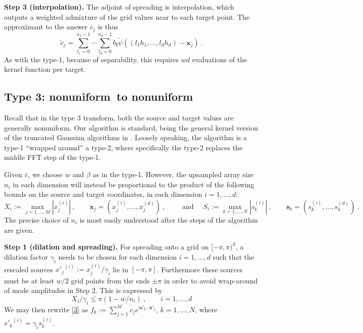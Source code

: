 \documentclass[10pt]{article}
\newcommand{\be}{\begin{equation}}
\newcommand{\ee}{\end{equation}}
\newcommand{\mbf}[1]{{\mathbf #1}}
\newcommand{\eps}{\varepsilon}
\newcommand{\xx}{\mbf{x}}
\newcommand{\sss}{\mbf{s}}
\newcommand{\freq}{\beta}          %
\newcommand{\ppsi}{{\tilde\psi}}   %
\newcommand{\NU}{{nonuniform}}       %
\begin{document}
{\bf Step 3 (interpolation).}
The adjoint of spreading is interpolation, which
outputs a weighted admixture of the
grid values near to each target point.
The approximant to the answer $c_j$ is thus
\be
\tilde c_j = \sum_{l_1=0}^{n_1-1} \cdots \sum_{l_d=0}^{n_d-1}
b_\mbf{l} \ppsi((l_1h_1,\dots,l_dh_d) - \xx_j)
~.
\label{interp}
\ee
As with the type-1,
because of separability,
this requires $wd$ evaluations of the kernel function per target.



\subsection{Type 3: \NU\ to \NU}

Recall that in the type 3 transform,
both the source and target values are generally \NU.
Our algorithm is standard, being
the general kernel version of the truncated Gaussian algorithms in
\cite[Alg.~3]{nufft} \cite[Alg.~2]{elbel} \cite{nufft3}
\cite[Sec.~1.3]{nfftchap}.
Loosely speaking, the algorithm is a
type-1 ``wrapped around'' a type-2, where specifically
the type-2 replaces the middle FFT step of the type-1.

Given $\eps$, we choose $w$ and $\freq$ as in the type-1.
However, the upsampled array size $n_i$ in each dimension
will instead be proportional to the product of the following bounds on the
source and target coordinates,
in each dimension $i=1,\dots,d$:
\be
X_i := \max_{j=1,\dots,M} |x_j^{(i)}|
~,\qquad
\xx_j = (x_j^{(i)},\dots,x_j^{(d)})
~,\qquad\mbox{ and }
\quad
S_i := \max_{k=1,\dots,N} |s_k^{(i)}|
~,\qquad
\sss_k = (s_k^{(i)},\dots,s_k^{(d)})
~.
\label{XS}
\ee
The precise choice of $n_i$ is most easily understood after the
steps of the algorithm are given.

{\bf Step 1 (dilation and spreading).}
For spreading onto a grid on $[-\pi,\pi)^d$,
a dilation factor $\gamma_i$ needs to be chosen
for each dimension $i=1,\ldots,d$ 
such that the rescaled sources ${x'_j}^{(i)} := x_j^{(i)}/\gamma_i$
lie in $[-\pi,\pi]$. Furthermore these sources must be
at least $w/2$ grid points
from the ends $\pm\pi$ in order
to avoid wrap-around of mode amplitudes in Step 2.
This is expressed by
\be
X_i/\gamma_i \le \pi(1 - w/n_i)
~, \qquad i=1,\dots,d
\label{cond1}
\ee
We may then rewrite \eqref{3} as
$f_k := \sum_{j=1}^M c_j e^{i \sss'_k \cdot \xx'_j}$, $k=1,\dots, N$,
where ${s'_k}^{(i)} = \gamma_i s_k^{(i)}$.
\end{document}
